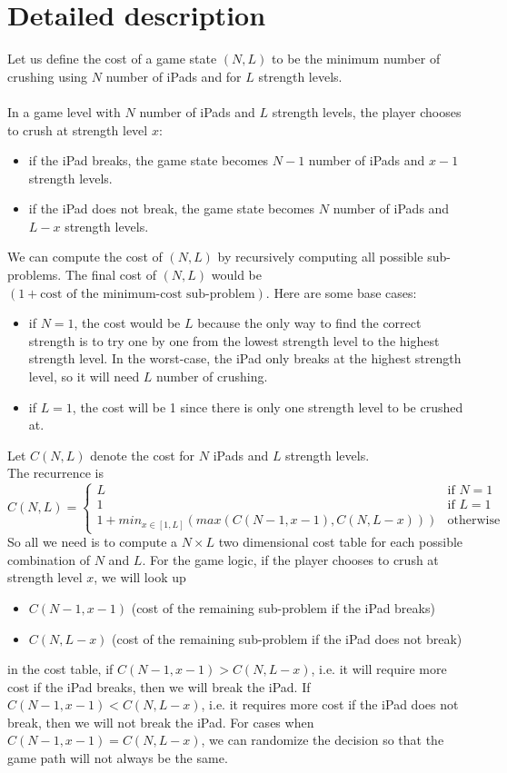 \documentclass[12pt,a4paper,oneside]{report}
\begin{document}
\section{Detailed description}
Let us define the cost of a game state $(N, L)$ to be the minimum number of crushing using $N$ number of iPads and for $L$ strength levels. \\\\
In a game level with $N$ number of iPads and $L$ strength levels, the player chooses to crush at strength level $x$:
\begin{itemize}
\item if the iPad breaks, the game state becomes $N - 1$ number of iPads and $x - 1$ strength levels.
\item if the iPad does not break, the game state becomes $N$ number of iPads and $L - x$ strength levels.
\end{itemize}
We can compute the cost of $(N, L)$ by recursively computing all possible sub-problems. The final cost of $(N, L)$ would be $(1 + \text{cost of the minimum-cost sub-problem})$. Here are some base cases:
\begin{itemize}
\item if $N = 1$, the cost would be $L$ because the only way to find the correct strength is to try one by one from the lowest strength level to the highest strength level. In the worst-case, the iPad only breaks at the highest strength level, so it will need $L$ number of crushing.
\item if $L = 1$, the cost will be 1 since there is only one strength level to be crushed at.
\end{itemize}
Let $C(N, L)$ denote the cost for $N$ iPads and $L$ strength levels. \\
The recurrence is
\[
C(N, L) = 
\begin{cases}
L & \text{if $N = 1$} \\
1 & \text{if $L = 1$} \\
1 + min_{x \in [1, L]}(max(C(N - 1, x - 1), C(N, L - x))) & \text{otherwise}
\end{cases}
\]
So all we need is to compute a $N \times L$ two dimensional cost table for each possible combination of $N$ and $L$. For the game logic, if the player chooses to crush at strength level $x$, we will look up 
\begin{itemize}
\item $C(N - 1, x - 1)$ (cost of the remaining sub-problem if the iPad breaks)
\item $C(N, L - x)$ (cost of the remaining sub-problem if the iPad does not break)
\end{itemize}
in the cost table, if $C(N - 1, x - 1) > C(N, L - x)$, i.e. it will require more cost if the iPad breaks, then we will break the iPad. If $C(N - 1, x - 1) < C(N, L - x)$, i.e. it requires more cost if the iPad does not break, then we will not break the iPad. For cases when $C(N - 1, x - 1) = C(N, L - x)$, we can randomize the decision so that the game path will not always be the same.
\end{document}
